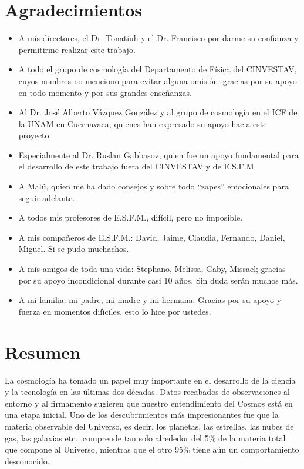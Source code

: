 \documentclass[a4paper,openright,10pt, oneside, final]{book}
\begin{document}
\chapter*{Agradecimientos} %
\begin{itemize}
\item A mis directores, el Dr. Tonatiuh y el Dr. Francisco por darme su confianza y permitirme realizar este trabajo.
\item A todo el grupo de cosmología del Departamento de Física del CINVESTAV, cuyos nombres no menciono para evitar alguna omisión, gracias por su apoyo en todo momento y por sus grandes enseñanzas.
\item Al Dr. José Alberto Vázquez González y al grupo de cosmología en el ICF de la UNAM en Cuernavaca, quienes han expresado su apoyo hacia este proyecto.
\item Especialmente al Dr. Ruslan Gabbasov, quien fue un apoyo fundamental para el desarrollo de este trabajo fuera del CINVESTAV y de E.S.F.M.
\item A Malú, quien me ha dado consejos y sobre todo ``zapes'' emocionales para seguir adelante.
\item A todos mis profesores de E.S.F.M., difícil, pero no imposible.
\item A mis compañeros de E.S.F.M.: David, Jaime, Claudia, Fernando, Daniel, Miguel. Si se pudo muchachos.
\item A mis amigos de toda una vida: Stephano, Melissa, Gaby, Missael; gracias por su apoyo incondicional durante casi 10 años. Sin duda serán muchos más.
\item A mi familia: mi padre, mi madre y mi hermana. Gracias por su apoyo y fuerza en momentos difíciles, esto lo hice por ustedes.
\end{itemize}



\chapter*{Resumen} %

La cosmología ha tomado un papel muy importante en el desarrollo de la ciencia y la tecnología en las últimas dos décadas. Datos recabados de observaciones al entorno y al firmamento sugieren que nuestro entendimiento del Cosmos está en una etapa inicial. Uno de los descubrimientos más impresionantes fue que la materia observable del Universo, es decir, los planetas, las estrellas, las nubes de gas, las galaxias etc., comprende tan solo alrededor del 5\% de la materia total que compone al Universo, mientras que el otro 95\% tiene aún un comportamiento desconocido.
\end{document}
